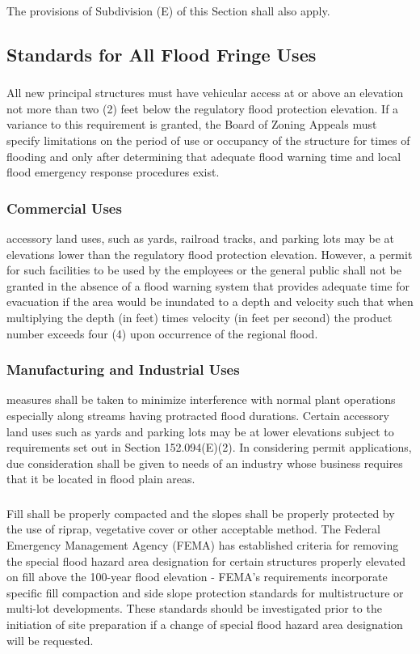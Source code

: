 \subsubsection{}
The provisions of Subdivision (E) of this Section shall also apply.
\subsection{Standards for All Flood Fringe Uses}
\subsubsection{}
All new principal structures must have vehicular access at or above an elevation not more than two (2) feet below the regulatory flood protection elevation. If a variance to this requirement is granted, the Board of Zoning Appeals must specify limitations on the period of use or occupancy of the structure for times of flooding and only after determining that adequate flood warning time and local flood emergency response procedures exist.
\subsubsection{Commercial Uses}
accessory land uses, such as yards, railroad tracks, and parking lots may be at elevations lower than the regulatory flood protection elevation. However, a permit for such facilities to be used by the employees or the general public shall not be granted in the absence of a flood warning system that provides adequate time for evacuation if the area would be inundated to a depth and velocity such that when multiplying the depth (in feet) times velocity (in feet per second) the product number exceeds four (4) upon occurrence of the regional flood.
\subsubsection{Manufacturing and Industrial Uses}
measures shall be taken to minimize interference with normal plant operations especially along streams having protracted flood durations. Certain accessory land uses such as yards and parking lots may be at lower elevations subject to requirements set out in Section 152.094(E)(2). In considering permit applications, due consideration shall be given to needs of an industry whose business requires that it be located in flood plain areas.
\subsubsection{}
Fill shall be properly compacted and the slopes shall be properly protected by the use of riprap, vegetative cover or other acceptable method. The Federal Emergency Management Agency (FEMA) has established criteria for removing the special flood hazard area designation for certain structures properly elevated on fill above the 100-year flood elevation - FEMA's requirements incorporate specific fill compaction and side slope protection standards for multistructure or multi-lot developments. These standards should be investigated prior to the initiation of site preparation if a change of special flood hazard area designation will be requested.
